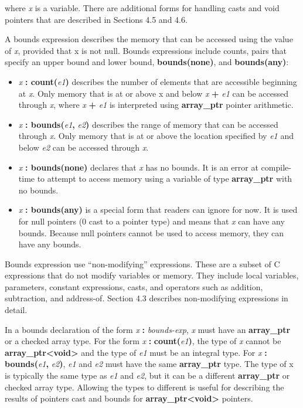 \documentclass[]{article}
\begin{document}
where \emph{x} is a variable. There are additional forms for handling
casts and void pointers that are described in Sections 4.5 and 4.6.

A bounds expression describes the memory that can be accessed using the
value of \emph{x}, provided that x is not null. Bounds expressions
include counts, pairs that specify an upper bound and lower bound,
\textbf{bounds(none)}, and \textbf{bounds(any)}:

\begin{itemize}
\item
  \emph{x} \textbf{: count(}\emph{e1}\textbf{)} describes the number of
  elements that are accessible beginning at \emph{x}. Only memory that
  is at or above x and below \emph{x} \textbf{+} \emph{e1} can be
  accessed through \emph{x}, where \emph{x} \textbf{+} \emph{e1} is
  interpreted using \textbf{array\_ptr} pointer arithmetic.
\item
  \emph{x} \textbf{: bounds(}\emph{e1}\textbf{,} \emph{e2}\textbf{)}
  describes the range of memory that can be accessed through \emph{x}.
  Only memory that is at or above the location specified by \emph{e1}
  and below \emph{e2} can be accessed through \emph{x}.
\item
  \emph{x} \textbf{: bounds(none)} declares that \emph{x} has no bounds.
  It is an error at compile-time to attempt to access memory using a
  variable of type \textbf{array\_ptr} with no bounds.
\item
  \emph{x} \textbf{: bounds(any)} is a special form that readers can
  ignore for now. It is used for null pointers (0 cast to a pointer
  type) and means that \emph{x} can have any bounds. Because null
  pointers cannot be used to access memory, they can have any bounds.
\end{itemize}

Bounds expression use ``non-modifying'' expressions. These are a subset
of C expressions that do not modify variables or memory. They include
local variables, parameters, constant expressions, casts, and operators
such as addition, subtraction, and address-of. Section 4.3 describes
non-modifying expressions in detail.

In a bounds declaration of the form \emph{x} \textbf{:}
\emph{bounds-exp}, \emph{x} must have an \textbf{array\_ptr} or a
checked array type. For the form \emph{x} \textbf{:}
\textbf{count(}\emph{e1}\textbf{)}, the type of \emph{x} cannot be
\textbf{array\_ptr\textless{}void\textgreater{}} and the type of
\emph{e1} must be an integral type. For \emph{x} \textbf{:}
\textbf{bounds(}\emph{e1}\textbf{,} \emph{e2}\textbf{)}, \emph{e1} and
\emph{e2} must have the same \textbf{array\_ptr} type. The type of x is
typically the same type as \emph{e1} and \emph{e2}, but it can be a
different \textbf{array\_ptr} or checked array type. Allowing the types
to different is useful for describing the results of pointers cast and
bounds for \textbf{array\_ptr\textless{}void\textgreater{}} pointers.
\end{document}
